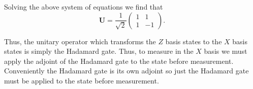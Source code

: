 \documentclass[12pt]{article}
\begin{document}
    Solving the above system of equations we find that
    \begin{equation*}
        \mathbf{U} = \frac{1}{\sqrt{2}} \begin{pmatrix} 1 & 1 \\ 1 & -1 \end{pmatrix}.
    \end{equation*}

    Thus, the unitary operator which transforms the $Z$ basis states to the $X$ basis states is simply the Hadamard gate. Thus, to measure in the $X$ basis we must apply the adjoint of the Hadamard gate to the state before measurement. Conveniently the Hadamard gate is its own adjoint so just the Hadamard gate must be applied to the state before measurement.

    


\end{document}
